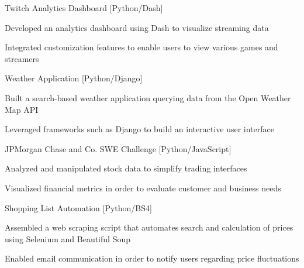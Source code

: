 
\begin{cventries}
  \cventry
    {} %
    {Twitch Analytics Dashboard [Python/Dash]} %
    {} %
    {} %
    {
      \begin{cvitems} %
        \item {Developed an analytics dashboard using Dash to visualize streaming data}
		\item {Integrated customization features to enable users to view various games and streamers}
      \end{cvitems}
    }

  \cventry
    {} %
    {Weather Application [Python/Django]}
    {} %
    {} %
    {
      \begin{cvitems} %
      	\item {Built a search-based weather application querying data from the Open Weather Map API}
		\item {Leveraged frameworks such as Django to build an interactive user interface}
      \end{cvitems}
    }

  \cventry
    {} %
    {JPMorgan Chase and Co. SWE Challenge [Python/JavaScript]}
    {} %
    {} %
    {
      \begin{cvitems} %
      	\item {Analyzed and manipulated stock data to simplify trading interfaces}
		\item {Visualized financial metrics in order to evaluate customer and business needs}
      \end{cvitems}
    }
  \cventry
    {} %
    {Shopping List Automation [Python/BS4]}
    {} %
    {} %
    {
      \begin{cvitems} %
      	\item {Assembled a web scraping script that automates search and calculation of prices using Selenium and Beautiful Soup}
		\item {Enabled email communication in order to notify users regarding price fluctuations}
      \end{cvitems}
    }
\end{cventries}